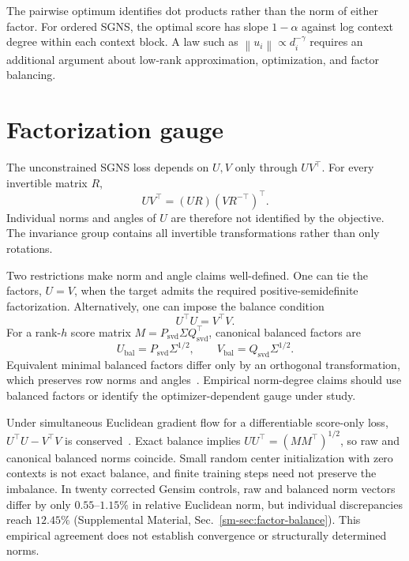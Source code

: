 \documentclass[aps,pre,reprint,superscriptaddress,longbibliography]{revtex4-2}
\newcommand{\norm}[1]{\left\lVert #1 \right\rVert}
\begin{document}
The pairwise optimum identifies dot products rather than the norm of either factor.
For ordered SGNS, the optimal score has slope \(1-\alpha\) against log context degree within each context block.
A law such as \(\norm{u_i}\propto d_i^{-\gamma}\) requires an additional argument about low-rank approximation, optimization, and factor balancing.

\section{Factorization gauge}
\label{sec:gauge}

The unconstrained SGNS loss depends on \(U,V\) only through \(UV^\top\).
For every invertible matrix \(R\),
\begin{equation}
    UV^\top
    =
    (UR)(VR^{-\top})^\top.
    \label{eq:gauge}
\end{equation}
Individual norms and angles of \(U\) are therefore not identified by the objective.
The invariance group contains all invertible transformations rather than only rotations.

Two restrictions make norm and angle claims well-defined.
One can tie the factors, \(U=V\), when the target admits the required positive-semidefinite factorization.
Alternatively, one can impose the balance condition
\begin{equation}
    U^\top U=V^\top V.
    \label{eq:balance}
\end{equation}
For a rank-\(h\) score matrix \(M=P_{\mathrm{svd}}\Sigma Q_{\mathrm{svd}}^\top\), canonical balanced factors are
\begin{equation}
    U_{\mathrm{bal}}=P_{\mathrm{svd}}\Sigma^{1/2},
    \qquad
    V_{\mathrm{bal}}=Q_{\mathrm{svd}}\Sigma^{1/2}.
    \label{eq:balanced-factors}
\end{equation}
Equivalent minimal balanced factors differ only by an orthogonal transformation, which preserves row norms and angles~\citep[Proposition~S24]{davison2024community}.
Empirical norm-degree claims should use balanced factors or identify the optimizer-dependent gauge under study.

Under simultaneous Euclidean gradient flow for a differentiable score-only loss, \(U^\top U-V^\top V\) is conserved~\citep{du2018algorithmic}.
Exact balance implies \(UU^\top=(MM^\top)^{1/2}\), so raw and canonical balanced norms coincide.
Small random center initialization with zero contexts is not exact balance, and finite training steps need not preserve the imbalance.
In twenty corrected Gensim controls, raw and balanced norm vectors differ by only \(0.55\)--\(1.15\%\) in relative Euclidean norm, but individual discrepancies reach \(12.45\%\) (Supplemental Material, Sec.~\ref{sm-sec:factor-balance}).
This empirical agreement does not establish convergence or structurally determined norms.
\end{document}

